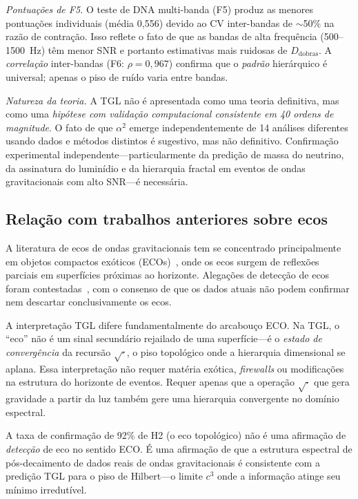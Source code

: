 \documentclass[12pt,a4paper,twocolumn]{article}
\newcommand{\alphaii}{\alpha^{2}}
\newcommand{\Dfolds}{D_{\text{dobras}}}
\begin{document}
\textit{Pontuações de F5.} O teste de DNA multi-banda (F5) produz as menores pontuações individuais (média 0,556) devido ao CV inter-bandas de $\sim$50\% na razão de contração. Isso reflete o fato de que as bandas de alta frequência (500--1500~Hz) têm menor SNR e portanto estimativas mais ruidosas de $\Dfolds$. A \emph{correlação} inter-bandas (F6: $\rho = 0{,}967$) confirma que o \emph{padrão} hierárquico é universal; apenas o piso de ruído varia entre bandas.

\textit{Natureza da teoria.} A TGL não é apresentada como uma teoria definitiva, mas como uma \emph{hipótese com validação computacional consistente em 40 ordens de magnitude}. O fato de que $\alphaii$ emerge independentemente de 14 análises diferentes usando dados e métodos distintos é sugestivo, mas não definitivo. Confirmação experimental independente---particularmente da predição de massa do neutrino, da assinatura do luminídio e da hierarquia fractal em eventos de ondas gravitacionais com alto SNR---é necessária.

\subsection{Relação com trabalhos anteriores sobre ecos}

A literatura de ecos de ondas gravitacionais tem se concentrado principalmente em objetos compactos exóticos (ECOs)~\cite{Cardoso2016}, onde os ecos surgem de reflexões parciais em superfícies próximas ao horizonte. Alegações de detecção de ecos~\cite{Abedi2017} foram contestadas~\cite{Westerweck2018,Nielsen2019}, com o consenso de que os dados atuais não podem confirmar nem descartar conclusivamente os ecos.

A interpretação TGL difere fundamentalmente do arcabouço ECO. Na TGL, o ``eco'' não é um sinal secundário rejailado de uma superfície---é o \emph{estado de convergência} da recursão $\sqrt{\cdot}$, o piso topológico onde a hierarquia dimensional se aplana. Essa interpretação não requer matéria exótica, \textit{firewalls} ou modificações na estrutura do horizonte de eventos. Requer apenas que a operação $\sqrt{\cdot}$ que gera gravidade a partir da luz também gere uma hierarquia convergente no domínio espectral.

A taxa de confirmação de 92\% de H2 (o eco topológico) não é uma afirmação de \emph{detecção} de eco no sentido ECO. É uma afirmação de que a estrutura espectral de pós-decaimento de dados reais de ondas gravitacionais é consistente com a predição TGL para o piso de Hilbert---o limite $c^3$ onde a informação atinge seu mínimo irredutível.
\end{document}
